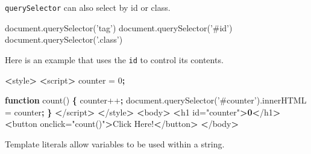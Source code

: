 \documentclass[]{book}
\newenvironment{Shaded}{\begin{snugshade}}{\end{snugshade}}
\newcommand{\ExtensionTok}[1]{#1}
\newcommand{\FunctionTok}[1]{\textcolor[rgb]{0.00,0.00,0.00}{#1}}
\newcommand{\KeywordTok}[1]{\textcolor[rgb]{0.13,0.29,0.53}{\textbf{#1}}}
\newcommand{\NormalTok}[1]{#1}
\newcommand{\OperatorTok}[1]{\textcolor[rgb]{0.81,0.36,0.00}{\textbf{#1}}}
\newcommand{\StringTok}[1]{\textcolor[rgb]{0.31,0.60,0.02}{#1}}
\newcommand{\VariableTok}[1]{\textcolor[rgb]{0.00,0.00,0.00}{#1}}
\begin{document}
\texttt{querySelector} can also select by id or class.

\begin{Shaded}
\begin{Highlighting}[]
\ExtensionTok{document.querySelector}\NormalTok{(}\StringTok{'tag'}\NormalTok{)}
\ExtensionTok{document.querySelector}\NormalTok{(}\StringTok{'#id'}\NormalTok{)}
\ExtensionTok{document.querySelector}\NormalTok{(}\StringTok{'.class'}\NormalTok{)}
\end{Highlighting}
\end{Shaded}

Here is an example that uses the \texttt{id} to control its contents.

\begin{Shaded}
\begin{Highlighting}[]
\OperatorTok{<}\ExtensionTok{style}\OperatorTok{>}
    \OperatorTok{<}\ExtensionTok{script}\OperatorTok{>}
        \ExtensionTok{counter}\NormalTok{ = 0}\KeywordTok{;}                                               
                                                                   
        \KeywordTok{function}\FunctionTok{ count()} \KeywordTok{\{}                                         
            \ExtensionTok{counter++}\KeywordTok{;}                                             
            \ExtensionTok{document.querySelector}\NormalTok{(}\StringTok{'#counter'}\NormalTok{)}\ExtensionTok{.innerHTML}\NormalTok{ = counter}\KeywordTok{;}
        \KeywordTok{\}}                                                          
    \OperatorTok{<}\NormalTok{/}\ExtensionTok{script}\OperatorTok{>}
\OperatorTok{<}\NormalTok{/}\ExtensionTok{style}\OperatorTok{>}
\OperatorTok{<}\ExtensionTok{body}\OperatorTok{>}
    \OperatorTok{<}\ExtensionTok{h1}\NormalTok{ id=}\StringTok{"counter"}\OperatorTok{>0<}\NormalTok{/h1}\OperatorTok{>}                       
    \OperatorTok{<}\ExtensionTok{button}\NormalTok{ onclick=}\StringTok{"count()"}\OperatorTok{>}\NormalTok{Click Here!}\OperatorTok{<}\NormalTok{/button}\OperatorTok{>}
\OperatorTok{<}\NormalTok{/}\ExtensionTok{body}\OperatorTok{>}
\end{Highlighting}
\end{Shaded}

Template literals allow variables to be used within a string.

\begin{Shaded}
\end{Shaded}
\end{document}
